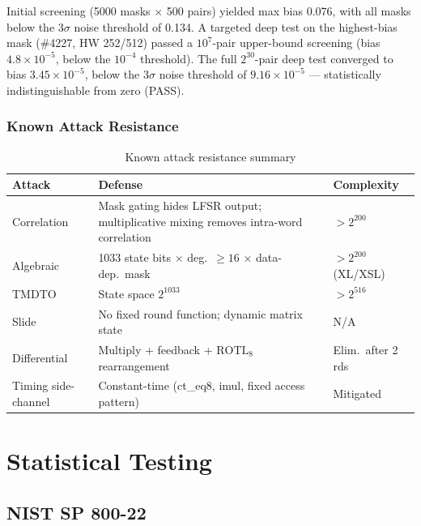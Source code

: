\documentclass[11pt,a4paper]{article}
\begin{document}
Initial screening (5000 masks $\times$ 500 pairs) yielded max bias 0.076, with
all masks below the $3\sigma$ noise threshold of 0.134. A targeted deep test on
the highest-bias mask (\#4227, HW 252/512) passed a $10^7$-pair upper-bound
screening (bias $4.8{\times}10^{-5}$, below the $10^{-4}$ threshold). The full
$2^{30}$-pair deep test converged to bias $3.45{\times}10^{-5}$, below the
$3\sigma$ noise threshold of $9.16{\times}10^{-5}$ — statistically
indistinguishable from zero (PASS).

\subsubsection{Known Attack Resistance}

\begin{table}[H]
\centering
\begin{tabular}{@{}lp{5.5cm}l@{}}
\toprule
\textbf{Attack} & \textbf{Defense} & \textbf{Complexity} \\
\midrule
Correlation \cite{golic} & Mask gating hides LFSR output; multiplicative mixing removes intra-word correlation & $>2^{200}$ \\
Algebraic \cite{courtois} & 1033 state bits $\times$ deg.\ $\ge 16$ $\times$ data-dep.\ mask & $>2^{200}$ (XL/XSL) \\
TMDTO \cite{babbage}    & State space $2^{1033}$ & $>2^{516}$ \\
Slide     & No fixed round function; dynamic matrix state & N/A \\
Differential \cite{biham} & Multiply + feedback + $\mathrm{ROTL}_8$ rearrangement & Elim.\ after 2 rds \\
Timing side-channel & Constant-time (ct\_eq8, imul, fixed access pattern) & Mitigated \\
\bottomrule
\end{tabular}
\caption{Known attack resistance summary}
\label{tab:attacks}
\end{table}

\section{Statistical Testing}

\subsection{NIST SP 800-22}
\end{document}
